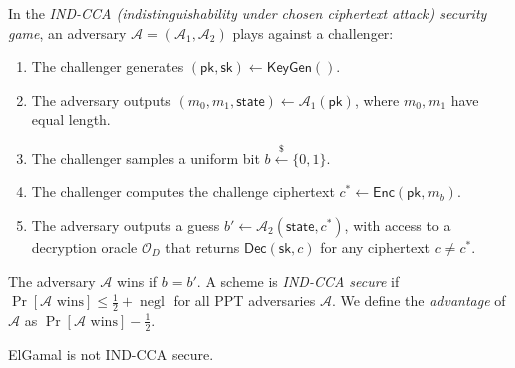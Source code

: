 
\begin{definition}
    In the \emph{IND-CCA (indistinguishability under chosen ciphertext attack) security game}, an adversary \(\mathcal{A} = (\mathcal{A}_1, \mathcal{A}_2)\) plays against a challenger:
    \begin{enumerate}
        \item The challenger generates \((\mathsf{pk}, \mathsf{sk}) \gets \mathsf{KeyGen}()\).
        \item The adversary outputs \((m_0, m_1, \mathsf{state}) \gets \mathcal{A}_1(\mathsf{pk})\), where \(m_0, m_1\) have equal length.
        \item The challenger samples a uniform bit \(b \xleftarrow{\$} \{0, 1\}\).
        \item The challenger computes the challenge ciphertext \(c^* \gets \mathsf{Enc}(\mathsf{pk}, m_b)\).
        \item The adversary outputs a guess \(b' \gets \mathcal{A}_2(\mathsf{state}, c^*)\), with access to a decryption oracle \(\mathcal{O}_D\) that returns \(\mathsf{Dec}(\mathsf{sk}, c)\) for any ciphertext \(c \neq c^*\).
    \end{enumerate}
    The adversary \(\mathcal{A}\) wins if \(b = b'\).
    A scheme is \emph{IND-CCA secure} if \(\Pr[\mathcal{A} \text{ wins}] \le \frac{1}{2} + \operatorname{negl}\) for all PPT adversaries \(\mathcal{A}\).
    We define the \emph{advantage} of \(\mathcal{A}\) as \(\Pr[\mathcal{A} \text{ wins}] - \frac{1}{2}\).
\end{definition}

\begin{theorem}
    ElGamal is not IND-CCA secure.
\end{theorem}

